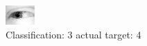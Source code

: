 \begin{figure}[h!]
\begin{center}
\includegraphics[width=0.60\columnwidth]{figures/ID2500_class_3_target_4.png}
\end{center}
\caption{ Classification: 3 actual target: 4}
\label{fig:ID2500_class_3_target_4}
\end{figure}
